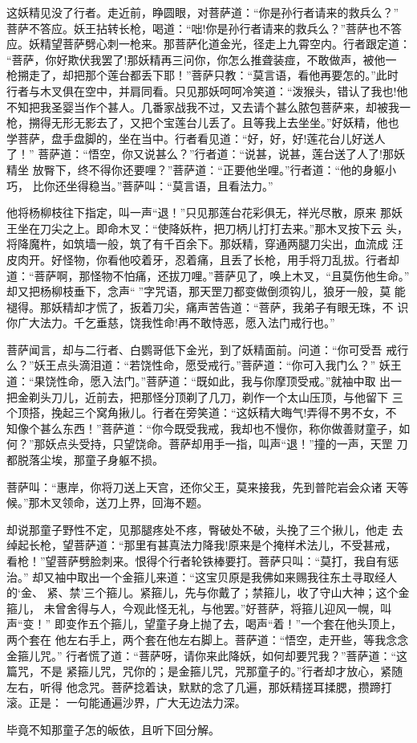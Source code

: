这妖精见没了行者。走近前，睁圆眼，对菩萨道：“你是孙行者请来的救兵么？”
菩萨不答应。妖王拈转长枪，喝道：“咄!你是孙行者请来的救兵么？”菩萨也不答
应。妖精望菩萨劈心刺一枪来。那菩萨化道金光，径走上九霄空内。行者跟定道：
“菩萨，你好欺伏我罢了!那妖精再三问你，你怎么推聋装痖，不敢做声，被他一
枪搠走了，却把那个莲台都丢下耶！”菩萨只教：“莫言语，看他再要怎的。”此时
行者与木叉俱在空中，并肩同看。只见那妖呵呵冷笑道：“泼猴头，错认了我也!他
不知把我圣婴当作个甚人。几番家战我不过，又去请个甚么脓包菩萨来，却被我一
枪，搠得无形无影去了，又把个宝莲台儿丢了。且等我上去坐坐。”好妖精，他也
学菩萨，盘手盘脚的，坐在当中。行者看见道：“好，好，好!莲花台儿好送人了！”
菩萨道：“悟空，你又说甚么？”行者道：“说甚，说甚，莲台送了人了!那妖精坐
放臀下，终不得你还要哩？”菩萨道：“正要他坐哩。”行者道：“他的身躯小巧，
比你还坐得稳当。”菩萨叫：“莫言语，且看法力。”

他将杨柳枝往下指定，叫一声“退！”只见那莲台花彩俱无，祥光尽散，原来
那妖王坐在刀尖之上。即命木叉：“使降妖杵，把刀柄儿打打去来。”那木叉按下云
头，将降魔杵，如筑墙一般，筑了有千百余下。那妖精，穿通两腿刀尖出，血流成
汪皮肉开。好怪物，你看他咬着牙，忍着痛，且丢了长枪，用手将刀乱拔。行者却
道：“菩萨啊，那怪物不怕痛，还拔刀哩。”菩萨见了，唤上木叉，“且莫伤他生命。”
却又把杨柳枝垂下，念声“”字咒语，那天罡刀都变做倒须钩儿，狼牙一般，莫
能褪得。那妖精却才慌了，扳着刀尖，痛声苦告道：“菩萨，我弟子有眼无珠，不
识你广大法力。千乞垂慈，饶我性命!再不敢恃恶，愿入法门戒行也。”

菩萨闻言，却与二行者、白鹦哥低下金光，到了妖精面前。问道：“你可受吾
戒行么？”妖王点头滴泪道：“若饶性命，愿受戒行。”菩萨道：“你可入我门么？”
妖王道：“果饶性命，愿入法门。”菩萨道：“既如此，我与你摩顶受戒。”就袖中取
出一把金剃头刀儿，近前去，把那怪分顶剃了几刀，剃作一个太山压顶，与他留下
三个顶搭，挽起三个窝角揪儿。行者在旁笑道：“这妖精大晦气!弄得不男不女，不
知像个甚么东西！”菩萨道：“你今既受我戒，我却也不慢你，称你做善财童子，如
何？”那妖点头受持，只望饶命。菩萨却用手一指，叫声“退！”撞的一声，天罡
刀都脱落尘埃，那童子身躯不损。

菩萨叫：“惠岸，你将刀送上天宫，还你父王，莫来接我，先到普陀岩会众诸
天等候。”那木叉领命，送刀上界，回海不题。

却说那童子野性不定，见那腿疼处不疼，臀破处不破，头挽了三个揪儿，他走
去绰起长枪，望菩萨道：“那里有甚真法力降我!原来是个掩样术法儿，不受甚戒，
看枪！”望菩萨劈脸刺来。恨得个行者轮铁棒要打。菩萨只叫：“莫打，我自有惩治。”
却又袖中取出一个金箍儿来道：“这宝贝原是我佛如来赐我往东土寻取经人的‘金、
紧、禁’三个箍儿。紧箍儿，先与你戴了；禁箍儿，收了守山大神；这个金箍儿，
未曾舍得与人，今观此怪无礼，与他罢。”好菩萨，将箍儿迎风一幌，叫声“变！”
即变作五个箍儿，望童子身上抛了去，喝声“着！”一个套在他头顶上，两个套在
他左右手上，两个套在他左右脚上。菩萨道：“悟空，走开些，等我念念金箍儿咒。”
行者慌了道：“菩萨呀，请你来此降妖，如何却要咒我？”菩萨道：“这篇咒，不是
紧箍儿咒，咒你的；是金箍儿咒，咒那童子的。”行者却才放心，紧随左右，听得
他念咒。菩萨捻着诀，默默的念了几遍，那妖精搓耳揉腮，攒蹄打滚。正是：
一句能通遍沙界，广大无边法力深。

毕竟不知那童子怎的皈依，且听下回分解。